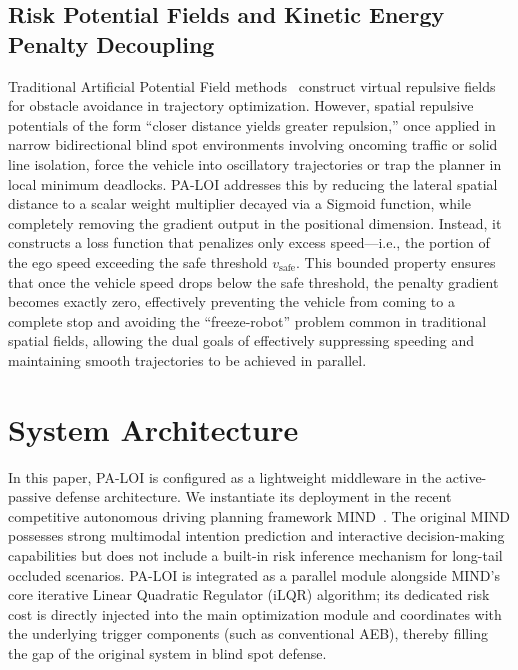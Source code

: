 \documentclass[conference]{IEEEtran}
\begin{document}
\subsection{Risk Potential Fields and Kinetic Energy Penalty Decoupling}
Traditional Artificial Potential Field methods~\cite{khatib1986potential} construct virtual repulsive fields for obstacle avoidance in trajectory optimization. However, spatial repulsive potentials of the form ``closer distance yields greater repulsion,'' once applied in narrow bidirectional blind spot environments involving oncoming traffic or solid line isolation, force the vehicle into oscillatory trajectories or trap the planner in local minimum deadlocks. PA-LOI addresses this by reducing the lateral spatial distance to a scalar weight multiplier decayed via a Sigmoid function, while completely removing the gradient output in the positional dimension. Instead, it constructs a loss function that penalizes only excess speed---i.e., the portion of the ego speed exceeding the safe threshold $v_{\text{safe}}$. This bounded property ensures that once the vehicle speed drops below the safe threshold, the penalty gradient becomes exactly zero, effectively preventing the vehicle from coming to a complete stop and avoiding the ``freeze-robot'' problem common in traditional spatial fields, allowing the dual goals of effectively suppressing speeding and maintaining smooth trajectories to be achieved in parallel.

\section{System Architecture}

In this paper, PA-LOI is configured as a lightweight middleware in the active-passive defense architecture. We instantiate its deployment in the recent competitive autonomous driving planning framework MIND~\cite{mind2025}. The original MIND possesses strong multimodal intention prediction and interactive decision-making capabilities but does not include a built-in risk inference mechanism for long-tail occluded scenarios. PA-LOI is integrated as a parallel module alongside MIND's core iterative Linear Quadratic Regulator (iLQR) algorithm; its dedicated risk cost is directly injected into the main optimization module and coordinates with the underlying trigger components (such as conventional AEB), thereby filling the gap of the original system in blind spot defense.
\end{document}
